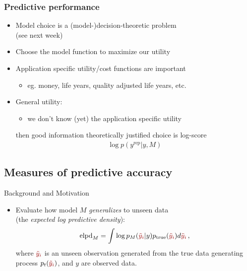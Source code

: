 \documentclass[10pt]{beamer}
\begin{document}
\begin{frame}

\frametitle{Predictive performance}

  \begin{itemize}
  \item Model choice is a (model-)decision-theoretic problem \\ (see next week)
  \pause
  \item Choose the model function to maximize our utility
  \pause
  \item Application specific utility/cost functions are important
    \begin{itemize}
      \item eg. money, life years, quality adjusted life years, etc.
    \end{itemize}
  \pause
  \item General utility: 
  \begin{itemize}
    \item we don't know (yet) the application specific utility
  \end{itemize}
    then good information theoretically justified choice is log-score
      \begin{align*}
        \log p(y^{\text{rep}} | y, M)
      \end{align*}
\end{itemize}

\end{frame}

\subsection{Measures of predictive accuracy}




\begin{frame}{Background and Motivation}



\begin{itemize}
\item Evaluate how model $M$ \emph{generalizes} to unseen data \\(the \emph{expected log predictive density}):
\[
\text{elpd}_M= \int \log p_M({\color{uured}\tilde{y}_i}|y) p_\text{true}({\color{uured}\tilde{y}_i}) d{\color{uured}\tilde{y}_i}\,,
\]
where ${\color{uured}\tilde{y}_i}$ is an unseen observation generated from the true data generating process $p_t({\color{uured}\tilde{y}_i})$, and $y$ are observed data.
\end{itemize}
\end{frame}
\end{document}
